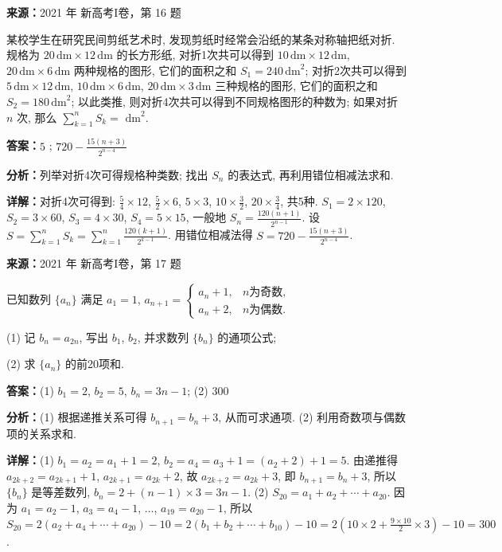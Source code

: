 \begin{question}[points=5]
\textbf{来源：}2021 年 新高考I卷，第 16 题\par
某校学生在研究民间剪纸艺术时, 发现剪纸时经常会沿纸的某条对称轴把纸对折. 规格为 $20\,\text{dm} \times 12\,\text{dm}$ 的长方形纸, 对折1次共可以得到 $10\,\text{dm} \times 12\,\text{dm}$, $20\,\text{dm} \times 6\,\text{dm}$ 两种规格的图形, 它们的面积之和 $S_1 = 240\,\text{dm}^2$; 对折2次共可以得到 $5\,\text{dm} \times 12\,\text{dm}$, $10\,\text{dm} \times 6\,\text{dm}$, $20\,\text{dm} \times 3\,\text{dm}$ 三种规格的图形, 它们的面积之和 $S_2 = 180\,\text{dm}^2$; 以此类推, 则对折4次共可以得到不同规格图形的种数为; 如果对折 $n$ 次, 那么 $\sum_{k=1}^{n} S_k =$ $\text{dm}^2$.
\fillin[{$5$ ; $720 - \frac{15(n+3)}{2^{n-4}}$}]
\begin{solution}
\textbf{答案：}$5$ ; $720 - \frac{15(n+3)}{2^{n-4}}$

\textbf{分析：}列举对折4次可得规格种类数; 找出 $S_n$ 的表达式, 再利用错位相减法求和.

\textbf{详解：}对折4次可得到: $\frac{5}{4}\times12$, $\frac{5}{2}\times6$, $5\times3$, $10\times\frac{3}{2}$, $20\times\frac{3}{4}$, 共5种. $S_1=2\times120$, $S_2=3\times60$, $S_3=4\times30$, $S_4=5\times15$, 一般地 $S_n = \frac{120(n+1)}{2^{n-1}}$. 设 $S = \sum_{k=1}^n S_k = \sum_{k=1}^n \frac{120(k+1)}{2^{k-1}}$. 用错位相减法得 $S = 720 - \frac{15(n+3)}{2^{n-4}}$.
\end{solution}
\end{question}

\begin{question}[points=10]
\textbf{来源：}2021 年 新高考I卷，第 17 题\par
已知数列 $\{a_n\}$ 满足 $a_1 = 1$, $a_{n+1} = \begin{cases} a_n + 1, & n \text{为奇数}, \\ a_n + 2, & n \text{为偶数}. \end{cases}$

(1) 记 $b_n = a_{2n}$, 写出 $b_1$, $b_2$, 并求数列 $\{b_n\}$ 的通项公式;

(2) 求 $\{a_n\}$ 的前20项和.
\begin{solution}
\textbf{答案：}(1) $b_1 = 2$, $b_2 = 5$, $b_n = 3n - 1$; (2) $300$

\textbf{分析：}(1) 根据递推关系可得 $b_{n+1} = b_n + 3$, 从而可求通项. (2) 利用奇数项与偶数项的关系求和.

\textbf{详解：}(1) $b_1 = a_2 = a_1 + 1 = 2$, $b_2 = a_4 = a_3 + 1 = (a_2 + 2) + 1 = 5$. 由递推得 $a_{2k+2} = a_{2k+1} + 1$, $a_{2k+1} = a_{2k} + 2$, 故 $a_{2k+2} = a_{2k} + 3$, 即 $b_{n+1} = b_n + 3$, 所以 $\{b_n\}$ 是等差数列, $b_n = 2 + (n-1)\times 3 = 3n - 1$.
(2) $S_{20} = a_1 + a_2 + \cdots + a_{20}$. 因为 $a_1 = a_2 - 1$, $a_3 = a_4 - 1$, $\ldots$, $a_{19} = a_{20} - 1$, 所以 $S_{20} = 2(a_2 + a_4 + \cdots + a_{20}) - 10 = 2(b_1 + b_2 + \cdots + b_{10}) - 10 = 2\left(10\times 2 + \frac{9\times 10}{2}\times 3\right) - 10 = 300$.
\end{solution}
\end{question}

